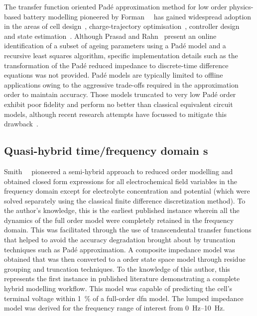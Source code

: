 

The     transfer     function     oriented    Padé     approximation     method
for    low    order    physics-based     battery    modelling    pioneered    by
Forman~\etal{}~\cite{Forman2011a}    has   gained    widespread   adoption    in
the    areas     of    cell     design~\cite{Marcicki2013},    charge-trajectory
optimisation~\cite{Bashash2010},    controller    design~\cite{Perez2015}    and
state    estimation~\cite{Marcicki2013,Moura2012}.     Although    Prasad    and
Rahn~\cite{Prasad2013} present  an online identification  of a subset  of ageing
parameters using a Padé model and a recursive least squares algorithm, specific
implementation details such as the transformation of the Padé reduced impedance
to  discrete-time  difference  equations  was not  provided.  Padé  models  are
typically limited  to offline  applications owing  to the  aggressive trade-offs
required in the approximation order to maintain accuracy. Those models truncated
to  very low  Padé  order exhibit  poor  fidelity and  perform  no better  than
classical  equivalent circuit  models,  although recent  research attempts  have
focussed  to  mitigate  this  drawback~\cite{Yuan2017a,Yuan2017}.


\subsection{Quasi-hybrid time/frequency domain s}

Smith~\etal{}~\cite{Smith2007}  pioneered  a  semi-hybrid  approach  to  reduced
order modelling  and obtained  closed form  expressions for  all electrochemical
field variables  in the  frequency domain  except for  electrolyte concentration
and  potential  (which  were  solved   separately  using  the  classical  finite
difference  discretization  method). To  the  author's  knowledge, this  is  the
earliest  published  instance  wherein  all  the  dynamics  of  the  full  order
model were  completely retained  in the frequency  domain. This  was facilitated
through  the use  of  transcendental  transfer functions  that  helped to  avoid
the  accuracy  degradation  brought  about  by  truncation  techniques  such  as
Padé  approximation. A  composite impedance  model was  obtained that  was then
converted  to  a    order state  space  model  through  residue
grouping  and truncation  techniques.  To  the knowledge  of  this author,  this
represents the first  instance in published literature  demonstrating a complete
hybrid  modelling workflow.  This model  was  capable of  predicting the  cell's
terminal voltage  within \SI{1}{\percent} of  a full-order \gls{dfn}  model. The
lumped impedance  model was  derived for  the frequency  range of  interest from
\SIrange{0}{10}{\hertz}.

